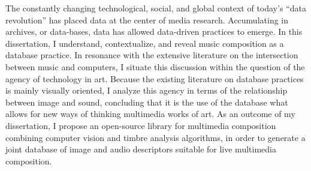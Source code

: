 The constantly changing technological, social, and global context of today's ``data revolution'' has placed data at the center of media research. Accumulating in archives, or data-bases, data has allowed data-driven practices to emerge. In this dissertation, I understand, contextualize, and reveal music composition as a database practice. In resonance with the extensive literature on the intersection between music and computers, I situate this discussion within the question of the agency of technology in art. Because the existing literature on database practices is mainly visually oriented, I analyze this agency in terms of the relationship between image and sound, concluding that it is the use of the database what allows for new ways of thinking multimedia works of art. As an outcome of my dissertation, I propose an open-source library for multimedia composition combining computer vision and timbre analysis algorithms, in order to generate a joint database of image and audio descriptors suitable for live multimedia composition.
